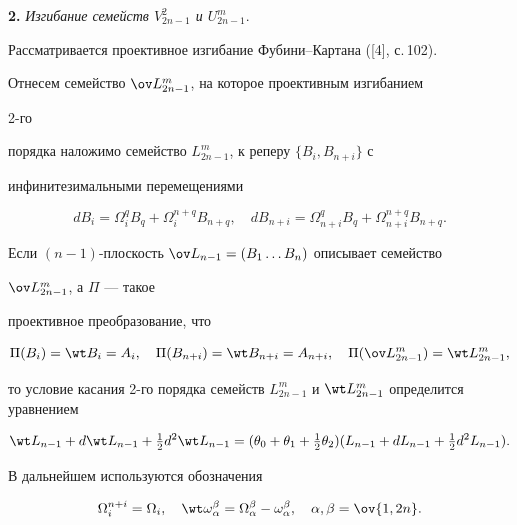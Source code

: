 


{\bf 2.} {\it Изгибание семейств $V^2_{2n-1}$ и $U^m_{2n-1}$}. 


Рассматривается проективное изгибание Фубини--Картана ([4], с.\,102). 


Отнесем семейство $\ov L{}^m_{2n-1}$, на которое проективным изгибанием 


2-го 


порядка наложимо семейство $L^m_{2n-1}$, к реперу $\{B_i,B_{n+i}\}$ с 


инфинитезимальными перемещениями 


$$ 


d B_i=\Omega^q_i B_q+\Omega^{n+q}_i B_{n+q},\quad 


d B_{n+i}=\Omega^q_{n+i}B_q+\Omega^{n+q}_{n+i}B_{n+q}. 


$$ 


Если $(n-1)$-плоскость $\ov L_{n-1}=(B_1\dotsc B_n)$ описывает семейство 


$\ov L{}^m_{2n-1}$, а $\Pi$ --- такое 


проективное преобразование, что 


$$ 


\Pi(B_i)=\wt B_i=A_i,\quad 


\Pi(B_{n+i})=\wt B_{n+i}=A_{n+i},\quad 


\Pi(\ov L{}^m_{2n-1})=\wt L{}^m_{2n-1}, 


$$ 


то условие касания 2-го порядка семейств $L^m_{2n-1}$ и $\wt 


L{}^m_{2n-1}$ определится уравнением 


$$ 


\wt L_{n-1}+d\wt L_{n-1}+\tfrac{1}{2}d^2\wt L_{n-1}= 


(\theta_0+\theta_1+\tfrac{1}{2}\theta_2)(L_{n-1}+d L_{n-1}+ 


\tfrac{1}{2}d^2L_{n-1}). 


$$ 


 


В дальнейшем используются обозначения 


$$ 


\Omega^{n+i}_i=\Omega_i,\quad 


\wt\omega{}^\beta_\alpha=\Omega^\beta_\alpha-\omega^\beta_\alpha, 


\quad \alpha,\beta=\ov{1,2n}. 


$$ 


 


